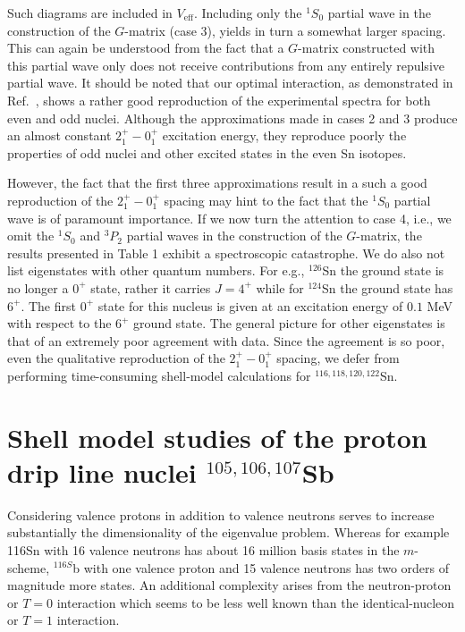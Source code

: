 \documentclass{ws-p8-50x6-00}
\begin{document}
Such diagrams are included in $V_{\mathrm{eff}}$. 
Including only the $^1S_0$ partial wave in the construction of the  $G$-matrix
(case 3),
yields in turn a somewhat larger spacing. This can again be understood from the
fact that a $G$-matrix constructed with this partial wave  
only does not receive contributions from any entirely repulsive partial wave.
It should be noted that our optimal interaction, as demonstrated in 
Ref.\ \cite{ehho98}, shows a rather good reproduction of the 
experimental spectra for both even and odd nuclei. Although the approximations
made in cases 2 and 3 produce an almost constant $2^+_1-0^+_1$ excitation energy,
they reproduce poorly the properties of odd nuclei and other 
excited states in the even Sn isotopes. 

However, the fact that the first three  approximations result in a such a good
reproduction of the  $2^+_1-0^+_1$ spacing may hint to the fact that the 
$^1S_0$ partial wave is of paramount importance. 
If we now turn the attention to case 4, i.e., we omit the
$^1S_0$ and $^3P_2$ partial waves in the construction of the $G$-matrix,
the results presented  in Table 1  exhibit  a spectroscopic 
catastrophe. We do also not list eigenstates
with other quantum numbers. For e.g., $^{126}$Sn
the ground state is no longer a $0^+$ state, rather it carries $J=4^+$ while for $^{124}$Sn the ground state 
has $6^+$. The first $0^+$ state for this nucleus is given at an excitation
energy of $0.1$ MeV with respect to the $6^+$ ground state.
The general picture for other eigenstates is that of 
an extremely poor agreement
with data.  
Since the agreement is so poor, even the qualitative reproduction of the 
$2^+_1-0^+_1$ spacing, we defer from performing time-consuming shell-model
calculations for $^{116,118,120,122}$Sn.


\section{Shell model studies of the proton drip line nuclei 
$^{105,106,107}$Sb}


Considering valence protons in addition to valence neutrons 
serves to increase substantially the dimensionality of the 
eigenvalue problem. Whereas for example 116Sn with 16 valence 
neutrons has about 16 million basis states in the $m$-scheme, 
$^{116S}$b with one valence proton and 15 valence neutrons has 
two orders of magnitude more states. An additional complexity 
arises from the neutron-proton or $T = 0$ interaction which 
seems to be less well known than the identical-nucleon or $T = 1$ interaction.
\end{document}
